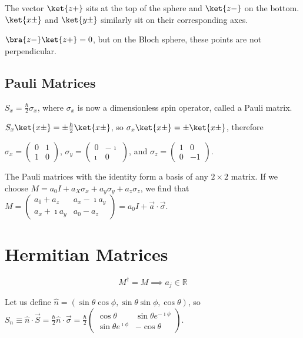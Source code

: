 \documentclass[a4paper,twoside,master.tex]{subfiles}
\begin{document}
The vector $\ket{z+}$ sits at the top of the sphere and $\ket{z-}$ on the bottom. $\ket{x\pm}$ and $\ket{y\pm}$ similarly sit on their corresponding axes.

$\bra{ z-}\ket{z+} = 0$, but on the Bloch sphere, these points are
not perpendicular.

\subsection{Pauli Matrices}
\label{sub:pauli_matrices}


$S_x = \frac{\hbar}{2}\sigma_x$, where $\sigma_x$ is now a
dimensionless spin operator, called a Pauli matrix.

$S_x\ket{x\pm} = \pm\frac{\hbar}{2}\ket{x\pm}$, so
$\sigma_x\ket{x\pm}=\pm\ket{x\pm}$, therefore

$\sigma_x = \left(\begin{matrix}0&1\\1&0\end{matrix}\right)$,
$\sigma_y = \left(\begin{matrix}0&-\imath\\\imath&0\end{matrix}\right)$,
and $\sigma_z = \left(\begin{matrix}1&0\\0&-1\end{matrix}\right)$.

The Pauli matrices with the identity form a basis of any $2\times2$
matrix. If we choose
$M=a_0 I + a_X\sigma_x + a_y\sigma_y + a_z\sigma_z$, we find that
$M=\left(\begin{matrix}a_0+a_z&a_x-\imath a_y\\a_x+\imath a_y&a_0-a_z\end{matrix}\right) = a_0 I + \vec{a}\cdot\vec{\sigma}$.

\section{Hermitian Matrices}
\label{sec:hermitian_matrices}


\begin{equation}
M^\dagger = M\implies a_j\in\mathbb{R}
\end{equation}

Let us define
$\hat{n} = (\sin\theta\cos\phi,\sin\theta\sin\phi,\cos\theta)$, so
$S_n\equiv\hat{n}\cdot\vec{S} = \frac{\hbar}{2}\hat{n}\cdot\vec{\sigma} = \frac{\hbar}{2}\left(\begin{matrix}\cos\theta&\sin\theta e^{-\imath\phi}\\\sin\theta e^{\imath\phi}&-\cos\theta\end{matrix}\right)$.
\end{document}
